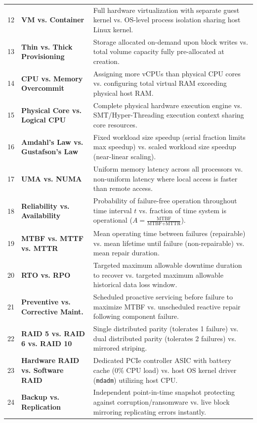 \begin{table}[htbp]
\begin{tabularx}{\textwidth}{l p{3.2cm} X}
12 & \textbf{VM vs. Container} & Full hardware virtualization with separate guest kernel vs. OS-level process isolation sharing host Linux kernel. \\
13 & \textbf{Thin vs. Thick Provisioning} & Storage allocated on-demand upon block writes vs. total volume capacity fully pre-allocated at creation. \\
14 & \textbf{CPU vs. Memory Overcommit} & Assigning more vCPUs than physical CPU cores vs. configuring total virtual RAM exceeding physical host RAM. \\
15 & \textbf{Physical Core vs. Logical CPU} & Complete physical hardware execution engine vs. SMT/Hyper-Threading execution context sharing core resources. \\
16 & \textbf{Amdahl's Law vs. Gustafson's Law} & Fixed workload size speedup (serial fraction limits max speedup) vs. scaled workload size speedup (near-linear scaling). \\
17 & \textbf{UMA vs. NUMA} & Uniform memory latency across all processors vs. non-uniform latency where local access is faster than remote access. \\
18 & \textbf{Reliability vs. Availability} & Probability of failure-free operation throughout time interval $t$ vs. fraction of time system is operational ($A = \frac{\text{MTBF}}{\text{MTBF} + \text{MTTR}}$). \\
19 & \textbf{MTBF vs. MTTF vs. MTTR} & Mean operating time between failures (repairable) vs. mean lifetime until failure (non-repairable) vs. mean repair duration. \\
20 & \textbf{RTO vs. RPO} & Targeted maximum allowable downtime duration to recover vs. targeted maximum allowable historical data loss window. \\
21 & \textbf{Preventive vs. Corrective Maint.} & Scheduled proactive servicing before failure to maximize MTBF vs. unscheduled reactive repair following component failure. \\
22 & \textbf{RAID 5 vs. RAID 6 vs. RAID 10} & Single distributed parity (tolerates 1 failure) vs. dual distributed parity (tolerates 2 failures) vs. mirrored striping. \\
23 & \textbf{Hardware RAID vs. Software RAID} & Dedicated PCIe controller ASIC with battery cache (0\% CPU load) vs. host OS kernel driver (\texttt{mdadm}) utilizing host CPU. \\
24 & \textbf{Backup vs. Replication} & Independent point-in-time snapshot protecting against corruption/ransomware vs. live block mirroring replicating errors instantly. \\

\end{tabularx}
\end{table}
